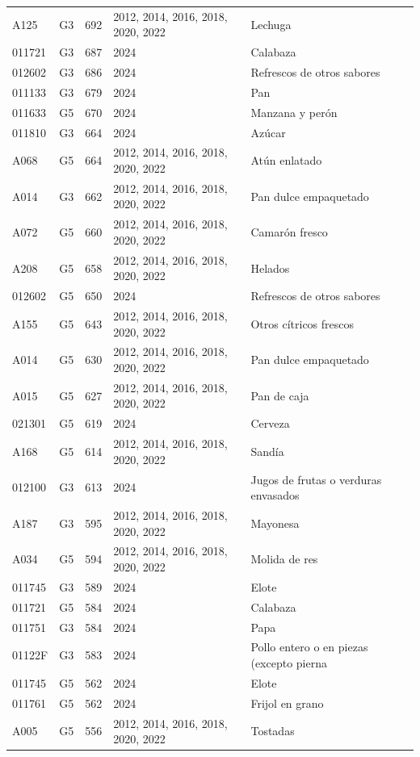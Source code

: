 \begin{table}[ht]
\begin{tabular}{llrll}
  A125 & G3 & 692 & 2012, 2014, 2016, 2018, 2020, 2022 & Lechuga \\ 
  011721 & G3 & 687 & 2024 & Calabaza \\ 
  012602 & G3 & 686 & 2024 & Refrescos de otros sabores \\ 
  011133 & G3 & 679 & 2024 & Pan \\ 
  011633 & G5 & 670 & 2024 & Manzana y perón \\ 
  011810 & G3 & 664 & 2024 & Azúcar \\ 
  A068 & G5 & 664 & 2012, 2014, 2016, 2018, 2020, 2022 & Atún enlatado \\ 
  A014 & G3 & 662 & 2012, 2014, 2016, 2018, 2020, 2022 & Pan dulce empaquetado \\ 
  A072 & G5 & 660 & 2012, 2014, 2016, 2018, 2020, 2022 & Camarón fresco \\ 
  A208 & G5 & 658 & 2012, 2014, 2016, 2018, 2020, 2022 & Helados \\ 
  012602 & G5 & 650 & 2024 & Refrescos de otros sabores \\ 
  A155 & G5 & 643 & 2012, 2014, 2016, 2018, 2020, 2022 & Otros cítricos frescos \\ 
  A014 & G5 & 630 & 2012, 2014, 2016, 2018, 2020, 2022 & Pan dulce empaquetado \\ 
  A015 & G5 & 627 & 2012, 2014, 2016, 2018, 2020, 2022 & Pan de caja \\ 
  021301 & G5 & 619 & 2024 & Cerveza \\ 
  A168 & G5 & 614 & 2012, 2014, 2016, 2018, 2020, 2022 & Sandía \\ 
  012100 & G3 & 613 & 2024 & Jugos de frutas o verduras envasados \\ 
  A187 & G3 & 595 & 2012, 2014, 2016, 2018, 2020, 2022 & Mayonesa \\ 
  A034 & G5 & 594 & 2012, 2014, 2016, 2018, 2020, 2022 & Molida de res \\ 
  011745 & G3 & 589 & 2024 & Elote \\ 
  011721 & G5 & 584 & 2024 & Calabaza \\ 
  011751 & G3 & 584 & 2024 & Papa \\ 
  01122F & G3 & 583 & 2024 & Pollo entero o en piezas (excepto pierna \\ 
  011745 & G5 & 562 & 2024 & Elote \\ 
  011761 & G5 & 562 & 2024 & Frijol en grano \\ 
  A005 & G5 & 556 & 2012, 2014, 2016, 2018, 2020, 2022 & Tostadas \\ 

\end{tabular}
\end{table}
